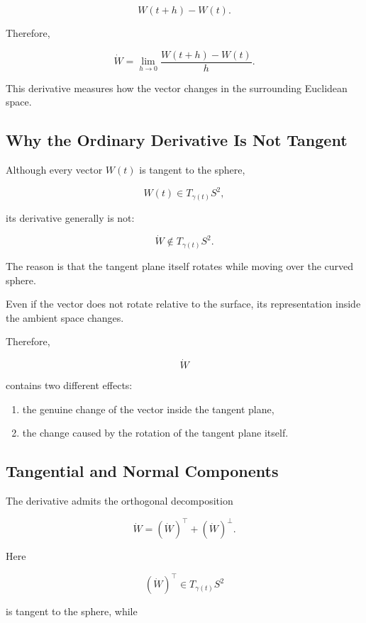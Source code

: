 \documentclass[12pt,a4paper]{article}
\theoremstyle{notespace}
\begin{document}
\[
W(t+h)-W(t).
\]

Therefore,

\[
\boxed{
	\dot W
	=
	\lim_{h\to0}
	\frac{W(t+h)-W(t)}{h}.
}
\]

This derivative measures how the vector changes in the surrounding
Euclidean space.


\subsection{Why the Ordinary Derivative Is Not Tangent}

Although every vector \(W(t)\) is tangent to the sphere,

\[
W(t)\in T_{\gamma(t)}S^2,
\]

its derivative generally is not:

\[
\boxed{
	\dot W
	\notin
	T_{\gamma(t)}S^2.
}
\]

The reason is that the tangent plane itself rotates while moving over the
curved sphere.

Even if the vector does not rotate relative to the surface, its
representation inside the ambient space changes.

Therefore,

\[
\dot W
\]

contains two different effects:

\begin{enumerate}
	\item
	the genuine change of the vector inside the tangent plane,
	
	\item
	the change caused by the rotation of the tangent plane itself.
\end{enumerate}


\subsection{Tangential and Normal Components}

The derivative admits the orthogonal decomposition

\[
\boxed{
	\dot W
	=
	(\dot W)^{\top}
	+
	(\dot W)^{\perp}.
}
\]

Here

\[
(\dot W)^{\top}
\in
T_{\gamma(t)}S^2
\]

is tangent to the sphere, while
\end{document}
